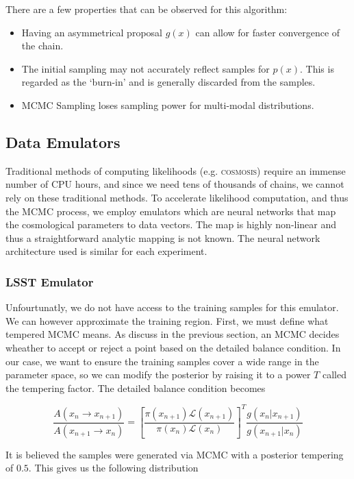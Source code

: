 There are a few properties that can be observed for this algorithm:
\begin{itemize}
    \item Having an asymmetrical proposal $g(x)$ can allow for faster convergence of the chain.
    \item The initial sampling may not accurately reflect samples for $p(x)$. 
    This is regarded as the `burn-in' and is generally discarded from the samples.
    \item MCMC Sampling loses sampling power for multi-modal distributions. 
\end{itemize}

\subsection{Data Emulators}

Traditional methods of computing likelihoods (e.g. \textsc{cosmosis}) require an immense number of CPU hours, and since we need tens of thousands of chains, we cannot rely on these traditional methods. 
To accelerate likelihood computation, and thus the MCMC process, we employ emulators which are neural networks that map the cosmological parameters to data vectors. 
The map is highly non-linear and thus a straightforward analytic mapping is not known. 
The neural network architecture used is similar for each experiment.

\subsubsection{LSST Emulator}
Unfourtunatly, we do not have access to the training samples for this emulator. 
We can however approximate the training region. First, we must define what tempered MCMC means. 
As discuss in the previous section, an MCMC decides wheather to accept or reject a point based on the detailed balance condition. 
In our case, we want to ensure the training samples cover a wide range in the parameter space, so we can modify the posterior by raising it to a power $T$ called the tempering factor. 
The detailed balance condition becomes

\begin{equation}
	\frac{A(x_n \rightarrow x_{n+1})}{A(x_{n+1}\rightarrow x_{n})} = \left[\frac{\pi(x_{n+1}) \mathcal{L}(x_{n+1})}{\pi(x_n)\mathcal{L}(x_n)}\right]^T \frac{ g(x_{n}|x_{n+1}) }{ g(x_{n+1}|x_n)} 
\end{equation}

It is believed the samples were generated via MCMC with a posterior tempering of $0.5$. 
This gives us the following distribution

